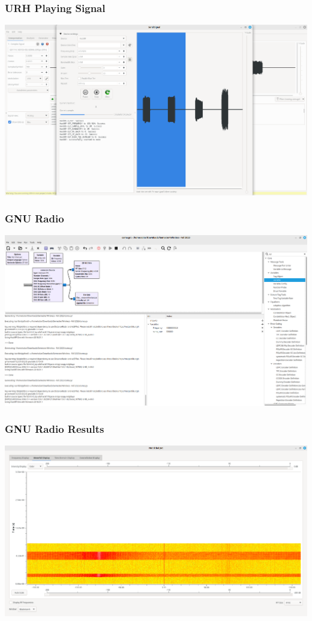\documentclass{beamer}
\begin{document}
\begin{frame}
\frametitle{URH Playing Signal}
\includegraphics[width=\textwidth]{../Pics/screenshots/URH_Playing_Signal.png}
\end{frame}

\begin{frame}
\frametitle{GNU Radio}
\includegraphics[width=\textwidth]{../Pics/screenshots/gnu_radio.png}
\end{frame}

\begin{frame}
\frametitle{GNU Radio Results}
\includegraphics[width=\textwidth]{../Pics/screenshots/gnu_radio_results.png}
\end{frame}
\end{document}

